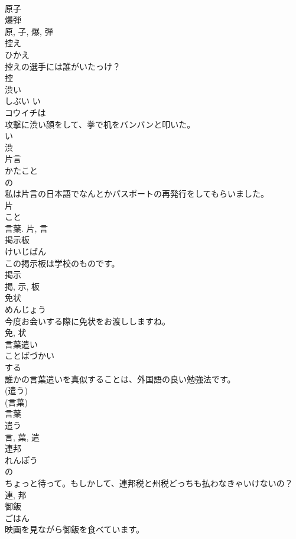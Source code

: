 \documentclass[8pt]{extreport}
\begin{document}
\begin{CJK}{UTF8}{min}
\\	原子 
\\	爆弾 
\\	原, 子, 爆, 弾	
\\	控え	
\\	ひかえ	
\\	控えの選手には誰がいたっけ？	
\\	控	
\\	渋い	
\\	しぶい	い 
\\	コウイチは
\\	攻撃に渋い顔をして、拳で机をバンバンと叩いた。	
\\	い 
\\	渋	
\\	片言	
\\	かたこと	
\\	の 
\\	私は片言の日本語でなんとかパスポートの再発行をしてもらいました。	
\\	片 
\\	こと 
\\	言葉.	片, 言	
\\	掲示板	
\\	けいじばん	
\\	この掲示板は学校のものです。	
\\	掲示 
\\	掲, 示, 板	
\\	免状	
\\	めんじょう	
\\	今度お会いする際に免状をお渡ししますね。	
\\	免, 状	
\\	言葉遣い	
\\	ことばづかい	
\\	する 
\\	誰かの言葉遣いを真似することは、外国語の良い勉強法です。	
\\	(遣う) 
\\	(言葉) 
\\	言葉 
\\	遣う 
\\	言, 葉, 遣	
\\	連邦	
\\	れんぽう	
\\	の 
\\	ちょっと待って。もしかして、連邦税と州税どっちも払わなきゃいけないの？	
\\	連, 邦	
\\	御飯	
\\	ごはん	
\\	映画を見ながら御飯を食べています。	

\end{CJK}
\end{document}
